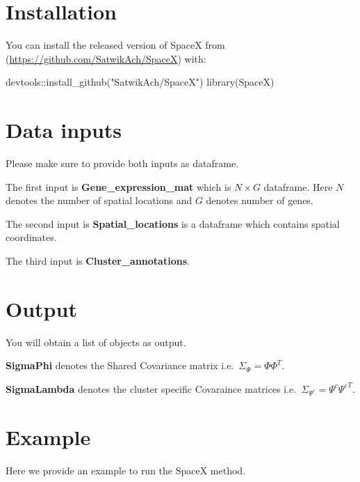 \documentclass[
]{book}
\newenvironment{Shaded}{\begin{snugshade}}{\end{snugshade}}
\newcommand{\FunctionTok}[1]{\textcolor[rgb]{0.00,0.00,0.00}{#1}}
\newcommand{\NormalTok}[1]{#1}
\newcommand{\SpecialCharTok}[1]{\textcolor[rgb]{0.00,0.00,0.00}{#1}}
\newcommand{\StringTok}[1]{\textcolor[rgb]{0.31,0.60,0.02}{#1}}
\begin{document}
\hypertarget{installation}{%
\section{Installation}\label{installation}}

You can install the released version of SpaceX from (\url{https://github.com/SatwikAch/SpaceX}) with:

\begin{Shaded}
\begin{Highlighting}[]
\NormalTok{devtools}\SpecialCharTok{::}\FunctionTok{install\_github}\NormalTok{(}\StringTok{"SatwikAch/SpaceX"}\NormalTok{)}
\FunctionTok{library}\NormalTok{(SpaceX)}
\end{Highlighting}
\end{Shaded}

\hypertarget{data-inputs}{%
\section{Data inputs}\label{data-inputs}}

Please make sure to provide both inputs as dataframe.

The first input is \textbf{Gene\_expression\_mat} which is \(N \times G\) dataframe. Here \(N\) denotes the number of spatial locations and \(G\) denotes number of genes.

The second input is \textbf{Spatial\_locations} is a dataframe which contains spatial coordinates.

The third input is \textbf{Cluster\_annotations}.

\hypertarget{output}{%
\section{Output}\label{output}}

You will obtain a list of objects as output.

\textbf{SigmaPhi} denotes the Shared Covariance matrix i.e.~\(\Sigma_{\Phi} = \Phi \Phi^{T}\).

\textbf{SigmaLambda} denotes the cluster specific Covaraince matrices i.e.~\(\Sigma_{\Psi^{c}} = \Psi^{c} {\Psi^{c}}^{T}\).

\hypertarget{example}{%
\section{Example}\label{example}}

Here we provide an example to run the SpaceX method.
\end{document}
